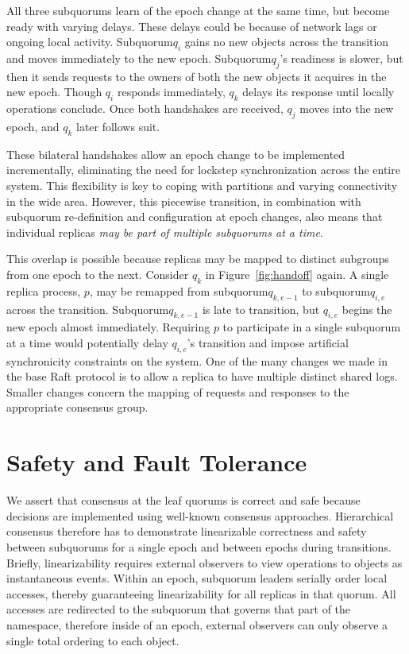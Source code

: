 \documentclass[10pt,conference]{IEEEtran}
\newcommand{\Hc}{Hierarchical consensus\xspace}
\newcommand{\sub}{subquorum\xspace}
\newcommand{\Sub}{Subquorum\xspace}
\newcommand{\subs}{subquorums\xspace}
\begin{document}
All three \subs learn of the epoch change at the same time, but become ready
with varying delays.
These delays could be because of network lags or ongoing local activity.
\Sub $q_i$ gains no new objects across the transition and moves immediately to the new
epoch.
\Sub $q_j$'s readiness is slower, but then it sends requests to the
owners of both the new objects it acquires in the new epoch.
Though $q_i$ responds immediately, $q_k$ delays its response until locally
operations conclude.
Once both handshakes are received, $q_j$ moves into the new epoch, and $q_k$
later follows suit.

These bilateral handshakes allow an epoch change to be implemented
incrementally, eliminating the need for lockstep synchronization across the entire
system.
This flexibility is key to coping with partitions and varying connectivity in
the wide area.
However, this piecewise transition, in combination with \sub re-definition and
configuration at epoch changes, also means that individual replicas \emph{may
be part of multiple \subs at a time}.

This overlap is possible because replicas may be mapped to distinct subgroups
from one epoch to the next.
Consider $q_k$ in Figure~\ref{fig:handoff} again.
A single replica process, $p$, may be remapped from \sub $q_{k,e-1}$ to \sub $q_{i,e}$
across the transition.
\Sub $q_{k,e-1}$ is late to transition, but $q_{i,e}$ begins the new epoch
almost immediately.
Requiring $p$ to participate in a single \sub at a time would potentially delay
$q_{i,e}$'s transition and impose artificial synchronicity constraints on the
system.
One of the many changes we made in the base Raft protocol is to allow a replica to have
multiple distinct shared logs.
Smaller changes concern the mapping of requests and responses to the appropriate
consensus group.

\section{Safety and Fault Tolerance}
\label{section:ft}


We assert that consensus at the leaf quorums is correct and safe because decisions are
implemented using well-known consensus approaches.
\Hc therefore has to demonstrate linearizable correctness and safety between \subs for a
single epoch and between epochs during transitions.
Briefly, linearizability requires external observers to view operations to objects as
instantaneous events.
Within an epoch, subquorum leaders serially order local accesses, thereby guaranteeing
linearizability for all replicas in that quorum.
All accesses are redirected to the \sub that governs that part of the namespace,
therefore inside of an epoch, external observers can only observe a single total ordering
to each object.
\end{document}
